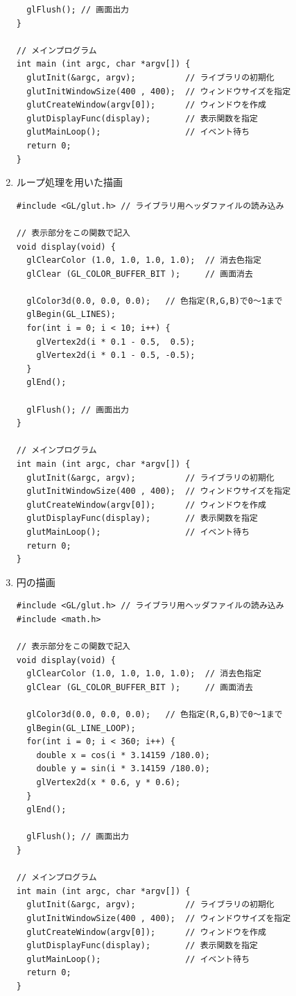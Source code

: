 \documentclass{scrartcl}
\begin{document}
\begin{enumerate}
\begin{verbatim}
  glFlush(); // 画面出力
}

// メインプログラム
int main (int argc, char *argv[]) { 
  glutInit(&argc, argv);          // ライブラリの初期化
  glutInitWindowSize(400 , 400);  // ウィンドウサイズを指定
  glutCreateWindow(argv[0]);      // ウィンドウを作成
  glutDisplayFunc(display);       // 表示関数を指定
  glutMainLoop();                 // イベント待ち
  return 0;
}
\end{verbatim}

\item ループ処理を用いた描画\\

\begin{verbatim}
#include <GL/glut.h> // ライブラリ用ヘッダファイルの読み込み

// 表示部分をこの関数で記入
void display(void) {        
  glClearColor (1.0, 1.0, 1.0, 1.0);  // 消去色指定
  glClear (GL_COLOR_BUFFER_BIT );     // 画面消去

  glColor3d(0.0, 0.0, 0.0);   // 色指定(R,G,B)で0～1まで
  glBegin(GL_LINES);
  for(int i = 0; i < 10; i++) {
    glVertex2d(i * 0.1 - 0.5,  0.5); 
    glVertex2d(i * 0.1 - 0.5, -0.5); 
  }
  glEnd();                               

  glFlush(); // 画面出力
}

// メインプログラム
int main (int argc, char *argv[]) { 
  glutInit(&argc, argv);          // ライブラリの初期化
  glutInitWindowSize(400 , 400);  // ウィンドウサイズを指定
  glutCreateWindow(argv[0]);      // ウィンドウを作成
  glutDisplayFunc(display);       // 表示関数を指定
  glutMainLoop();                 // イベント待ち
  return 0;
}
\end{verbatim}

\item 円の描画\\

\begin{verbatim}
#include <GL/glut.h> // ライブラリ用ヘッダファイルの読み込み
#include <math.h>

// 表示部分をこの関数で記入
void display(void) {        
  glClearColor (1.0, 1.0, 1.0, 1.0);  // 消去色指定
  glClear (GL_COLOR_BUFFER_BIT );     // 画面消去

  glColor3d(0.0, 0.0, 0.0);   // 色指定(R,G,B)で0～1まで
  glBegin(GL_LINE_LOOP);
  for(int i = 0; i < 360; i++) {
    double x = cos(i * 3.14159 /180.0);
    double y = sin(i * 3.14159 /180.0);
    glVertex2d(x * 0.6, y * 0.6); 
  }
  glEnd();                               

  glFlush(); // 画面出力
}

// メインプログラム
int main (int argc, char *argv[]) { 
  glutInit(&argc, argv);          // ライブラリの初期化
  glutInitWindowSize(400 , 400);  // ウィンドウサイズを指定
  glutCreateWindow(argv[0]);      // ウィンドウを作成
  glutDisplayFunc(display);       // 表示関数を指定
  glutMainLoop();                 // イベント待ち
  return 0;
}
\end{verbatim}
\end{enumerate}
\end{document}
